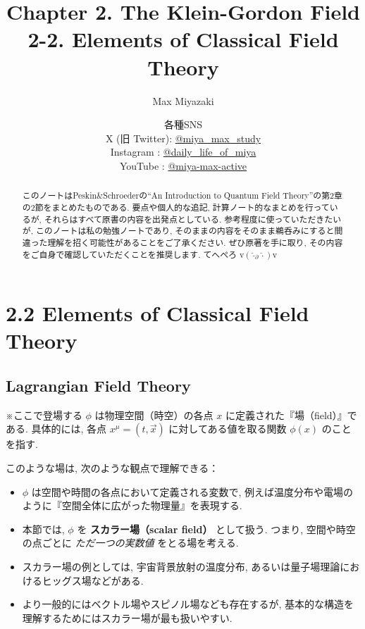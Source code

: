 \documentclass[a4paper,12pt]{article}
\title{Chapter 2. The Klein-Gordon Field\\
2-2. Elements of Classical Field Theory}
\date{各種SNS\\
    X (旧 Twitter): \href{https://x.com/miya_max_study}{@miya\_max\_study}\\
    Instagram : \href{https://www.instagram.com/daily_life_of_miya/}{@daily\_life\_of\_miya}\\
    YouTube : \href{https://www.youtube.com/@miya-max-active}{@miya-max-active}
    }
\author{Max Miyazaki}
\begin{document}
\maketitle

\vspace{1cm}
\begin{abstract}
    このノートはPeskin\&Schroederの``An Introduction to Quantum Field Theory''の第2章の2節をまとめたものである. 要点や個人的な追記, 計算ノート的なまとめを行っているが, それらはすべて原書の内容を出発点としている. 参考程度に使っていただきたいが, このノートは私の勉強ノートであり, そのままの内容をそのまま鵜呑みにすると間違った理解を招く可能性があることをご了承ください. ぜひ原著を手に取り, その内容をご自身で確認していただくことを推奨します. てへぺろ v$({\hat{\cdot}_\partial \hat{\cdot}})$v



\end{abstract}
    
    

\newpage
\section*{2.2 Elements of Classical Field Theory}
\subsection*{Lagrangian Field Theory}

\color{blue}
※ここで登場する $\phi$ は物理空間（時空）の各点 $x$ に定義された『場（field）』である. 具体的には, 各点 $x^\mu = (t, \vec{x})$ に対してある値を取る関数 $\phi(x)$ のことを指す.

このような場は, 次のような観点で理解できる：

\begin{itemize}
    \item $\phi$ は空間や時間の各点において定義される変数で, 例えば温度分布や電場のように『空間全体に広がった物理量』を表現する.
    \item 本節では, $\phi$ を \textbf{スカラー場（scalar field）} として扱う. つまり, 空間や時空の点ごとに \emph{ただ一つの実数値} をとる場を考える.
    \item スカラー場の例としては, 宇宙背景放射の温度分布, あるいは量子場理論におけるヒッグス場などがある.
    \item より一般的にはベクトル場やスピノル場なども存在するが, 基本的な構造を理解するためにはスカラー場が最も扱いやすい.
\end{itemize}
\end{document}

